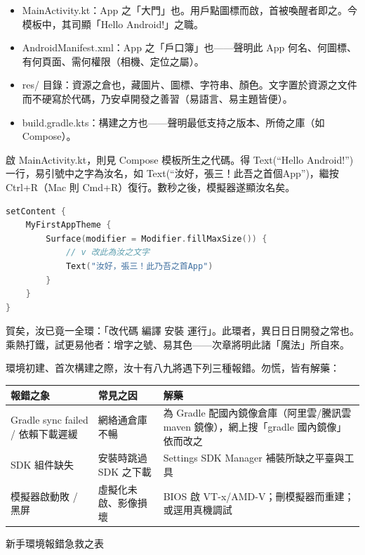 \begin{itemize}
  \item MainActivity.kt：App 之「大門」也。用戶點圖標而啟，首被喚醒者即之。今模板中，其司顯「Hello Android!」之職。
  \item AndroidManifest.xml：App 之「戶口簿」也——聲明此 App 何名、何圖標、有何頁面、需何權限（相機、定位之屬）。
  \item res/ 目錄：資源之倉也，藏圖片、圖標、字符串、顏色。文字置於資源之文件而不硬寫於代碼，乃安卓開發之善習（易語言、易主題皆便）。
  \item build.gradle.kts：構建之方也——聲明最低支持之版本、所倚之庫（如 Compose）。
\end{itemize}


啟 MainActivity.kt，則見 Compose 模板所生之代碼。得 Text(“Hello Android!”) 一行，易引號中之字為汝名，如 Text(“汝好，張三！此吾之首個App”)，繼按 Ctrl+R（Mac 則 Cmd+R）復行。數秒之後，模擬器遂顯汝名矣。

\begin{lstlisting}[language=Kotlin]
setContent {
    MyFirstAppTheme {
        Surface(modifier = Modifier.fillMaxSize()) {
            // v 改此為汝之文字
            Text("汝好，張三！此乃吾之首App")
        }
    }
}
\end{lstlisting}

賀矣，汝已竟一全環：「改代碼 編譯 安裝 運行」。此環者，異日日日開發之常也。乘熱打鐵，試更易他者：增字之號、易其色——次章將明此諸「魔法」所自來。


環境初建、首次構建之際，汝十有八九將遇下列三種報錯。勿慌，皆有解藥：

\begin{center}
\begin{tabularx}{\linewidth}{|X|X|X|}
\hline
\textbf{報錯之象} & \textbf{常見之因} & \textbf{解藥} \tabularnewline
\hline
Gradle sync failed / 依賴下載遲緩 & 網絡通倉庫不暢 & 為 Gradle 配國內鏡像倉庫（阿里雲/騰訊雲 maven 鏡像），網上搜「gradle 國內鏡像」依而改之 \tabularnewline
SDK 組件缺失 & 安裝時跳過 SDK 之下載 & Settings SDK Manager 補裝所缺之平臺與工具 \tabularnewline
模擬器啟動敗 / 黑屏 & 虛擬化未啟、影像損壞 & BIOS 啟 VT-x/AMD-V；刪模擬器而重建；或逕用真機調試 \tabularnewline
\hline
\end{tabularx}
\end{center}

\begin{center}\small\color{gray}新手環境報錯急救之表\end{center}

